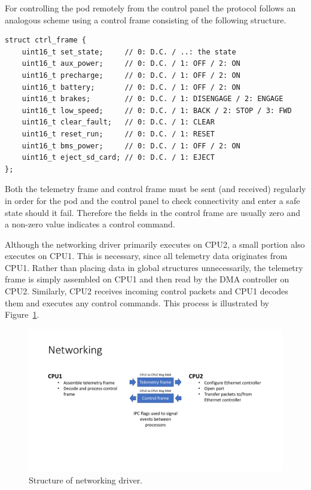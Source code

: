 For controlling the pod remotely from the control panel the protocol follows an analogous scheme using a control frame consisting of the following structure.

\begin{verbatim}
struct ctrl_frame {
    uint16_t set_state;     // 0: D.C. / ..: the state
    uint16_t aux_power;     // 0: D.C. / 1: OFF / 2: ON
    uint16_t precharge;     // 0: D.C. / 1: OFF / 2: ON
    uint16_t battery;       // 0: D.C. / 1: OFF / 2: ON
    uint16_t brakes;        // 0: D.C. / 1: DISENGAGE / 2: ENGAGE
    uint16_t low_speed;     // 0: D.C. / 1: BACK / 2: STOP / 3: FWD
    uint16_t clear_fault;   // 0: D.C. / 1: CLEAR
    uint16_t reset_run;     // 0: D.C. / 1: RESET
    uint16_t bms_power;     // 0: D.C. / 1: OFF / 2: ON
    uint16_t eject_sd_card; // 0: D.C. / 1: EJECT
};
\end{verbatim}

Both the telemetry frame and control frame must be sent (and received) regularly in order for the pod and the control panel to check connectivity and enter a safe state should it fail. Therefore the fields in the control frame are usually zero and a non-zero value indicates a control command.

Although the networking driver primarily executes on CPU2, a small portion also executes on CPU1. This is necessary, since all telemetry data originates from CPU1. Rather than placing data in global structures unnecessarily, the telemetry frame is simply assembled on CPU1 and then read by the DMA controller on CPU2. Similarly, CPU2 receives incoming control packets and CPU1 decodes them and executes any control commands. This process is illustrated by Figure~\ref{fig:networking_structure}.

\begin{figure}[H]
    \centering \includegraphics[width=1.0\textwidth]{./figures/networking_structure.pdf}
    \caption{Structure of networking driver.}
    \label{fig:networking_structure}
\end{figure}

